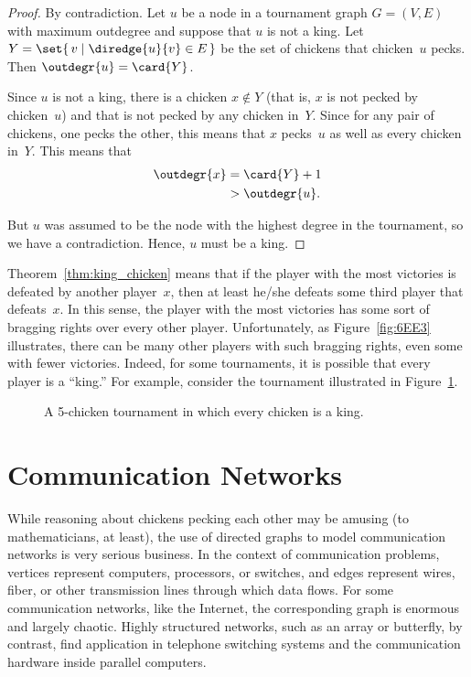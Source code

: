 \begin{proof}
By contradiction.  Let $u$ be a node in a tournament graph $G = (V,
E)$ with maximum outdegree and suppose that $u$ is not a king.  Let $Y
= \set{\, v \mid \diredge{u}{v} \in E \,}$ be the set of chickens that
chicken~$u$ pecks.  Then $\outdegr{u} = \card{Y}$.

Since $u$ is not a king, there is a chicken $x \notin Y$ (that is, $x$
is not pecked by chicken~$u$) and that is not pecked by any chicken
in~$Y$.  Since for any pair of chickens, one pecks the other, this
means that $x$ pecks~$u$ as well as every chicken in~$Y$.  This means
that
\begin{align*}
    \outdegr{x} &= \card{Y} + 1 \\
                &> \outdegr{u}.
\end{align*}

But $u$ was assumed to be the node with the highest degree in the
tournament, so we have a contradiction.  Hence, $u$ must be a king.
\end{proof}

Theorem~\ref{thm:king_chicken} means that if the player with the most
victories is defeated by another player~$x$, then at least he/she
defeats some third player that defeats~$x$.  In this sense, the player
with the most victories has some sort of bragging rights over every
other player.  Unfortunately, as Figure~\ref{fig:6EE3} illustrates,
there can be many other players with such bragging rights, even some
with fewer victories.  Indeed, for some tournaments, it is possible
that every player is a ``king.''  For example, consider the tournament
illustrated in Figure~\ref{fig:6EE4}.

\begin{figure}


\caption{A 5-chicken tournament in which every chicken is a king.}

\label{fig:6EE4}

\end{figure}

\section{Communication Networks}\label{sec:comm_nets}

While reasoning about chickens pecking each other may be amusing (to
mathematicians, at least), the use of directed graphs to model
communication networks is very serious business.  In the context of
communication problems, vertices represent computers, processors, or
switches, and edges represent wires, fiber, or other transmission
lines through which data flows.  For some communication networks, like
the Internet, the corresponding graph is enormous and largely chaotic.
Highly structured networks, such as an array or butterfly, by
contrast, find application in telephone switching systems and the
communication hardware inside parallel computers.

